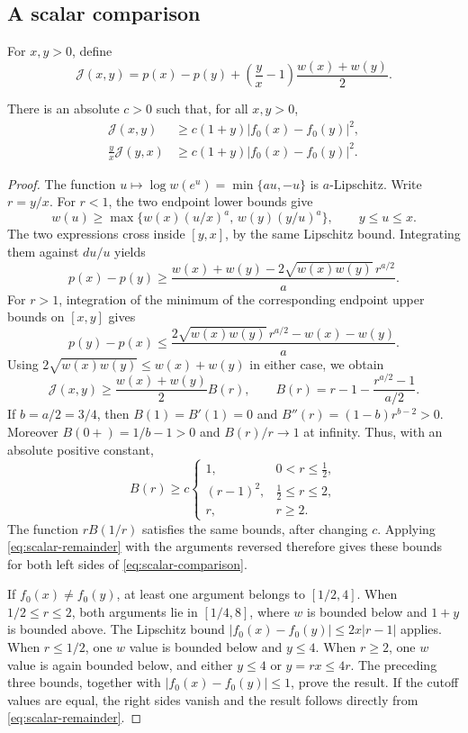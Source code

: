 \subsection{A scalar comparison}

For $x,y>0$, define
\[
 \mathcal J(x,y)=p(x)-p(y)
      +\left(\frac yx-1\right)\frac{w(x)+w(y)}2.
\]

\begin{lemma}
\label{lem:scalar-comparison}
There is an absolute $c>0$ such that, for all $x,y>0$,
\begin{equation}
 \begin{split}
 \mathcal J(x,y)&\ge c(1+y)|f_0(x)-f_0(y)|^2,\\
 \frac yx\mathcal J(y,x)&\ge c(1+y)|f_0(x)-f_0(y)|^2.
 \end{split}
 \label{eq:scalar-comparison}
\end{equation}
\end{lemma}

\begin{proof}
The function $u\mapsto\log w(e^u)=\min\{au,-u\}$ is
$a$-Lipschitz.  Write $r=y/x$.  For $r<1$, the two endpoint lower
bounds give
\[
 w(u)\ge
 \max\{w(x)(u/x)^a,\,w(y)(y/u)^a\},\qquad y\le u\le x.
\]
The two expressions cross inside $[y,x]$, by the same Lipschitz
bound.  Integrating them against $du/u$ yields
\[
 p(x)-p(y)\ge
 \frac{w(x)+w(y)-2\sqrt{w(x)w(y)}\,r^{a/2}}a.
\]
For $r>1$, integration of the minimum of the corresponding endpoint
upper bounds on $[x,y]$ gives
\[
 p(y)-p(x)\le
 \frac{2\sqrt{w(x)w(y)}\,r^{a/2}-w(x)-w(y)}a.
\]
Using $2\sqrt{w(x)w(y)}\le w(x)+w(y)$ in either case, we obtain
\begin{equation}
 \mathcal J(x,y)\ge\frac{w(x)+w(y)}2 B(r),
 \qquad
 B(r)=r-1-\frac{r^{a/2}-1}{a/2}.
 \label{eq:scalar-remainder}
\end{equation}
If $b=a/2=3/4$, then $B(1)=B'(1)=0$ and
$B''(r)=(1-b)r^{b-2}>0$.  Moreover
$B(0+)=1/b-1>0$ and $B(r)/r\longrightarrow1$ at infinity.
Thus, with an absolute positive constant,
\[
 B(r)\ge c
 \begin{cases}
  1,&0<r\le\tfrac12,\\
  (r-1)^2,&\tfrac12\le r\le2,\\
  r,&r\ge2.
 \end{cases}
\]
The function $rB(1/r)$ satisfies the same bounds, after changing $c$.
Applying \eqref{eq:scalar-remainder} with the arguments reversed
therefore gives these bounds for both left sides of
\eqref{eq:scalar-comparison}.

If $f_0(x)\ne f_0(y)$, at least one argument belongs to
$[1/2,4]$.  When $1/2\le r\le2$, both arguments lie in $[1/4,8]$,
where $w$ is bounded below and $1+y$ is bounded above.  The Lipschitz
bound $|f_0(x)-f_0(y)|\le2x|r-1|$ applies.  When $r\le1/2$,
one $w$ value is bounded below and $y\le4$.  When $r\ge2$,
one $w$ value is again bounded below, and either $y\le4$ or
$y=rx\le4r$.  The preceding three bounds, together with
$|f_0(x)-f_0(y)|\le1$, prove the result.  If the cutoff values
are equal, the right sides vanish and the result follows directly
from \eqref{eq:scalar-remainder}.
\end{proof}

